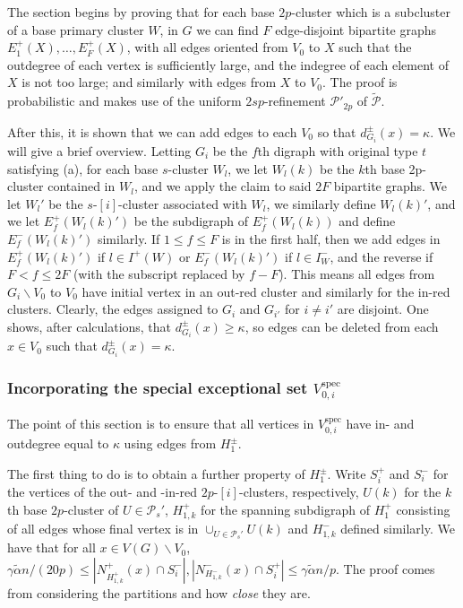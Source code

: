 \documentclass[10pt,letterpaper, reqno]{amsart}
\theoremstyle{definition}
\numberwithin{equation}{section}
\begin{document}
The section begins by proving that for each base $2p$-cluster which is a subcluster of a base primary cluster $W$, in $G$ we can find $F$ edge-disjoint bipartite graphs $E_1^+(X), \dots, E_F^+(X)$, with all edges oriented from $V_0$ to $X$ such that the outdegree of each vertex is sufficiently large, and the indegree of each element of $X$ is not too large; and similarly with edges from $X$ to $V_0$. The proof is probabilistic and makes use of the uniform $2sp$-refinement $\mathcal{P}'_{2p}$ of $\tilde{\mathcal{P}}$.

After this, it is shown that we can add edges to each $V_0$ so that $d^\pm_{G_i}(x) = \kappa$. We will give a brief overview. Letting $G_i$ be the $f$th digraph with original type $t$ satisfying (a), for each base $s$-cluster $W_l$, we let $W_l(k)$ be the $k$th base 2p-cluster contained in $W_l$, and we apply the claim to said $2F$ bipartite graphs. We let $W_l'$ be the $s$-$[i]$-cluster associated with $W_l$, we similarly define $W_l(k)'$, and we let $E^+_f(W_l(k)')$ be the subdigraph of $E^+_f(W_l(k))$ and define $E^-_f(W_l(k)')$ similarly. If $1\leq f \leq F$ is in the first half, then we add edges in $E^+_f(W_l(k)')$ if $l \in I^+(W)$ or $E^-_f(W_l(k)')$ if $l \in I^-_W$, and the reverse if $F<f\leq 2F$ (with the subscript replaced by $f-F$). This means all edges from $G_i \backslash V_0$ to $V_0$ have initial vertex in an out-red cluster and similarly for the in-red clusters. Clearly, the edges assigned to $G_i$ and $G_{i'}$ for $i \neq i'$ are disjoint. One shows, after calculations, that $d^\pm_{G_i}(x) \geq \kappa$, so edges can be deleted from each $x \in V_0$ such that $d_{G_i}^\pm(x) = \kappa$. 

\subsubsection{Incorporating the special exceptional set $V_{0,i}^\text{spec}$} The point of this section is to ensure that all vertices in $V_{0,i}^\text{spec}$ have in- and outdegree equal to $\kappa$ using edges from $H_1^\pm$. 

The first thing to do is to obtain a further property of $H^\pm_1$. Write $S^+_i$ and $S^-_i$ for the vertices of the out- and -in-red $2p$-$[i]$-clusters, respectively, $U(k)$ for the $k$th base $2p$-cluster of $U \in \mathcal{P}_s'$, $H^+_{1,k}$ for the spanning subdigraph of $H_1^+$ consisting of all edges whose final vertex is in $\cup_{U \in \mathcal{P}_s'}U(k)$ and $H^-_{1,k}$ defined similarly. We have that for all $x \in V(G)\backslash V_0$, $\gamma \tilde{\alpha}n/(20p) \leq |N^+_{H_{1,k}^+}(x) \cap S^-_i|, |N^-_{H_{1,k}^-}(x) \cap S^+_i| \leq \gamma \tilde{\alpha}n/p$. The proof comes from considering the partitions and how \textit{close} they are. 
\end{document}
